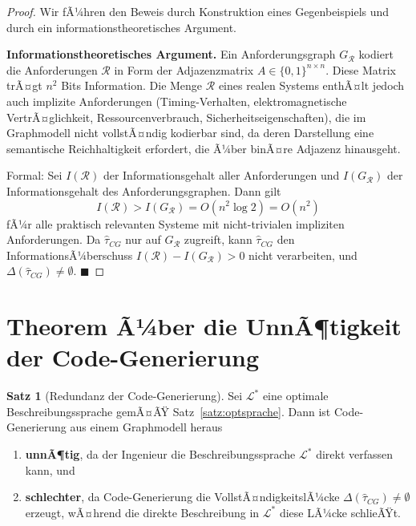 ﻿\documentclass[a4paper,12pt]{report}
\theoremstyle{definition}
\newtheorem{satz}{Satz}[section]
\begin{document}
\begin{proof}
Wir fÃ¼hren den Beweis durch Konstruktion eines Gegenbeispiels und durch ein
informationstheoretisches Argument.

\textbf{Informationstheoretisches Argument.}
Ein Anforderungsgraph $G_\mathcal{R}$ kodiert die Anforderungen $\mathcal{R}$ in Form
der Adjazenzmatrix $A \in \{0,1\}^{n \times n}$. Diese Matrix trÃ¤gt $n^2$ Bits Information.
Die Menge $\mathcal{R}$ eines realen Systems enthÃ¤lt jedoch auch implizite Anforderungen
(Timing-Verhalten, elektromagnetische VertrÃ¤glichkeit, Ressourcenverbrauch, Sicherheitseigenschaften),
die im Graphmodell nicht vollstÃ¤ndig kodierbar sind, da deren Darstellung eine
semantische Reichhaltigkeit erfordert, die Ã¼ber binÃ¤re Adjazenz hinausgeht.

Formal: Sei $I(\mathcal{R})$ der Informationsgehalt aller Anforderungen und
$I(G_\mathcal{R})$ der Informationsgehalt des Anforderungsgraphen. Dann gilt
\[
  I(\mathcal{R}) > I(G_\mathcal{R}) = O(n^2 \log 2) = O(n^2)
\]
fÃ¼r alle praktisch relevanten Systeme mit nicht-trivialen impliziten Anforderungen.
Da $\hat{\tau}_{CG}$ nur auf $G_\mathcal{R}$ zugreift, kann $\hat{\tau}_{CG}$
den InformationsÃ¼berschuss $I(\mathcal{R}) - I(G_\mathcal{R}) > 0$ nicht verarbeiten,
und $\Delta(\hat{\tau}_{CG}) \neq \emptyset$. $\blacksquare$
\end{proof}

\section{Theorem Ã¼ber die UnnÃ¶tigkeit der Code-Generierung}

\begin{satz}[Redundanz der Code-Generierung]
\label{satz:codegen}
Sei $\mathcal{L}^*$ eine optimale Beschreibungssprache gemÃ¤ÃŸ Satz~\ref{satz:optsprache}.
Dann ist Code-Generierung aus einem Graphmodell heraus
\begin{enumerate}
  \item \textbf{unnÃ¶tig}, da der Ingenieur die Beschreibungssprache $\mathcal{L}^*$ direkt
        verfassen kann, und
  \item \textbf{schlechter}, da Code-Generierung die VollstÃ¤ndigkeitslÃ¼cke
        $\Delta(\hat{\tau}_{CG}) \neq \emptyset$ erzeugt, wÃ¤hrend die direkte Beschreibung
        in $\mathcal{L}^*$ diese LÃ¼cke schlieÃŸt.
\end{enumerate}
\end{satz}
\end{document}
